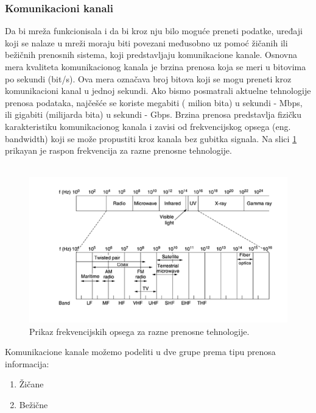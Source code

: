 \documentclass[a4paper]{article}
\begin{document}
\subsubsection{Komunikacioni kanali}
Da bi mreža funkcionisala i da bi kroz nju bilo moguće preneti podatke, uređaji koji se nalaze u mreži moraju biti povezani međusobno uz pomoć žičanih ili bežičnih prenosnih sistema, koji predstavljaju komunikacione kanale. Osnovna mera kvaliteta komunikacionog kanala je brzina prenosa koja se meri u bitovima po sekundi (bit/s). Ova mera označava broj bitova koji se mogu preneti kroz komunikacioni kanal u jednoj sekundi. Ako bismo posmatrali aktuelne tehnologije prenosa podataka, najčešće se koriste megabiti ( milion bita) u sekundi - Mbps, ili gigabiti (milijarda bita) u sekundi - Gbps. Brzina prenosa predstavlja fizičku karakteristiku komunikacionog kanala i zavisi od frekvencijskog opsega (eng. bandwidth) koji se može propustiti kroz kanala bez gubitka signala. Na slici \ref{fig:opseg} prikayan je raspon frekvencija za razne prenosne tehnologije. \\\\

\begin{figure}[h!]
\begin{center}
\includegraphics[scale=0.7]{pictures/bandw.png}
\end{center}
\caption{Prikaz frekvencijskih opsega za razne prenosne tehnologije.}
\label{fig:opseg}
\end{figure}

Komunikacione kanale možemo podeliti u dve grupe prema tipu prenosa informacija:
\begin{enumerate}
\item Žičane  
\item Bežične 
\end{enumerate}
\end{document}
